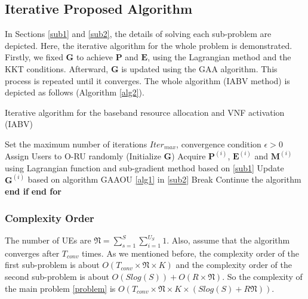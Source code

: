 \documentclass[conference]{IEEEtran}
\begin{document}
\subsection{Iterative Proposed Algorithm}
In Sections \eqref{sub1} and \eqref{sub2}, the details of solving each sub-problem are depicted. 
Here, the iterative algorithm for the whole problem is demonstrated.
Firstly, we fixed $\boldsymbol{G}$ to achieve $\boldsymbol{P}$ and $\boldsymbol{E}$, using the Lagrangian method and the KKT conditions.  
Afterward, $\boldsymbol{G}$ is updated using the GAA algorithm. This process is repeated until it converges. 
The whole algorithm (IABV method) is depicted as follows (Algorithm \ref{alg2}).
 \begin{algorithm}
\caption{Iterative algorithm for the baseband resource allocation and VNF activation (IABV)}\label{alg2}
\begin{algorithmic}[1]
\State  Set the maximum number of iterations ${Iter}_{max}$, convergence condition $\epsilon > 0$ \label{a21}
\State  Assign Users to O-RU randomly (Initialize $\boldsymbol{G}$) \label{a22}
\label{23}
\State Acquire $\boldsymbol{P}^{(i)}$, $\boldsymbol{E}^{(i)}$ and $\boldsymbol{M}^{(i)}$ using Lagrangian function and sub-gradient method based on \eqref{sub1}
\State Update $\boldsymbol{G}^{(i)}$   based on algorithm GAAOU \eqref{alg1} in  \eqref{sub2}
\State Break
\Else 
\State Continue the algorithm  
\EndIf
\State \textbf{end if}
\EndFor
\State \textbf{end for} \label{24}
\end{algorithmic}
\end{algorithm}
\subsubsection{Complexity Order}
The number of UEs are $\mathfrak{N} = \sum_{s=1}^{S}\sum_{i=1}^{U_S}1$.
Also, assume that the algorithm converges after $T_{conv}$ times.
As we mentioned before, the complexity order of the first sub-problem is about $O(T_{conv} \times \mathfrak{N} \times K)$
and the complexity order of the second sub-problem is about $O(Slog(S)) + O(R\times \mathfrak{N})$.
So the complexity of the main problem \eqref{problem} is $O(T_{conv} \times \mathfrak{N} \times K \times (Slog(S)+R\mathfrak{N}))$.
\end{document}
